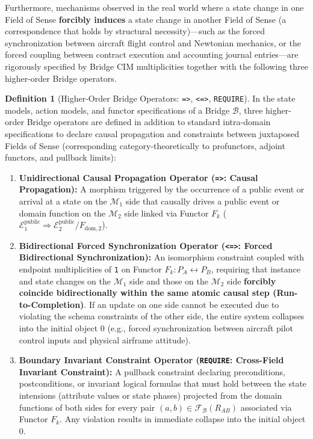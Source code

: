 \documentclass[11pt,a4paper]{article}
\theoremstyle{definition}
\newtheorem{definition}{Definition}[section]
\theoremstyle{plain}
\theoremstyle{remark}
\begin{document}
Furthermore, mechanisms observed in the real world where a state change in one Field of Sense \textbf{forcibly induces} a state change in another Field of Sense (a correspondence that holds by structural necessity)---such as the forced synchronization between aircraft flight control and Newtonian mechanics, or the forced coupling between contract execution and accounting journal entries---are rigorously specified by Bridge CIM multiplicities together with the following three higher-order Bridge operators.

\begin{definition}[Higher-Order Bridge Operators: \texttt{=>}, \texttt{<=>}, \texttt{REQUIRE}]\label{def:bridge-operators}
In the state models, action models, and functor specifications of a Bridge $\mathcal{B}$, three higher-order Bridge operators are defined in addition to standard intra-domain specifications to declare causal propagation and constraints between juxtaposed Fields of Sense (corresponding category-theoretically to profunctors, adjoint functors, and pullback limits):

\begin{enumerate}
    \item \textbf{Unidirectional Causal Propagation Operator (\texttt{=>}: Causal Propagation):}
    A morphism triggered by the occurrence of a public event or arrival at a state on the $\mathcal{M}_1$ side that causally drives a public event or domain function on the $\mathcal{M}_2$ side linked via Functor $F_k$ ($\mathcal{E}_1^{\mathrm{public}} \Rightarrow \mathcal{E}_2^{\mathrm{public}} / F_{\mathrm{dom}, 2}$).
    \item \textbf{Bidirectional Forced Synchronization Operator (\texttt{<=>}: Forced Bidirectional Synchronization):}
    An isomorphism constraint coupled with endpoint multiplicities of \texttt{1} on Functor $F_k : P_A \leftrightarrow P_B$, requiring that instance and state changes on the $\mathcal{M}_1$ side and those on the $\mathcal{M}_2$ side \textbf{forcibly coincide bidirectionally within the same atomic causal step (Run-to-Completion)}. If an update on one side cannot be executed due to violating the schema constraints of the other side, the entire system collapses into the initial object $0$ (e.g., forced synchronization between aircraft pilot control inputs and physical airframe attitude).
    \item \textbf{Boundary Invariant Constraint Operator (\texttt{REQUIRE}: Cross-Field Invariant Constraint):}
    A pullback constraint declaring preconditions, postconditions, or invariant logical formulas that must hold between the state intensions (attribute values or state phases) projected from the domain functions of both sides for every pair $(a, b) \in \mathcal{F}_{\mathcal{B}}(R_{AB})$ associated via Functor $F_k$. Any violation results in immediate collapse into the initial object $0$.
\end{enumerate}
\end{definition}
\end{document}
